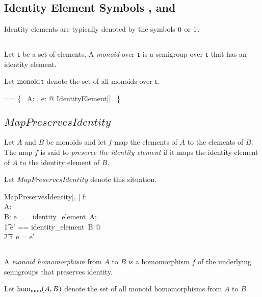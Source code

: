 \documentclass[11pt, oneside]{article}
\begin{document}
\subsection{Identity Element Symbols , and }

Identity elements are typically denoted by the symbols  $0$ or $1$.

\subsection{}

Let $\mathsf{t}$ be a set of elements.
A {\em monoid} over $\mathsf{t}$ is a semigroup over $\mathsf{t}$ that has an identity element.

Let $\operatorname{monoid} \mathsf{t}$ denote the set of all monoids over $\mathsf{t}$.

\begin{zed}
\monoid \genT == \{~ A: \semigroup \genT | \exists e: \genT @ IdentityElement[\genT] ~\}
\end{zed}


\subsection{$MapPreservesIdentity$}

Let $A$ and $B$ be monoids and let $f$ map the elements of $A$ to the elements of $B$.
The map $f$ is said to {\em preserve the identity element} if it maps the identity element of $A$
to the identity element of $B$.

Let $MapPreservesIdentity$ denote this situation.

\begin{schema}{MapPreservesIdentity}[\genT, \genU]
f: \genT \fun \genU \\
A: \monoid \genT \\
B: \monoid \genU
\where
\LET e == identity\_element~A; \\
\t1	e' == identity\_element~B @ \\
\t2		f~e = e'
\end{schema}

\subsection{}

A {\em monoid homomorphism} from $A$ to $B$ is a homomorphism $f$ of the underlying semigroups
that preserves identity.

Let $\operatorname{hom_{mon}}(A, B)$ denote the set of all monoid homomorphisms from $A$ to $B$.
\end{document}
